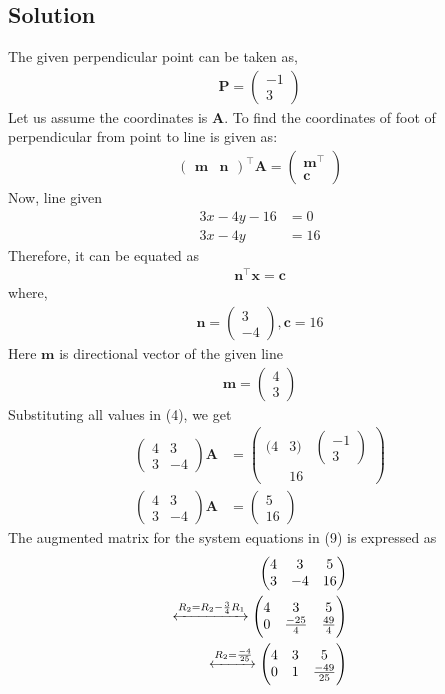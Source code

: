 \documentclass[12pt]{article}
\let\vec\mathbf
\newcommand{\myvec}[1]{\ensuremath{\begin{pmatrix}#1\end{pmatrix}}}
\let\vec\mathbf
\begin{document}
\begin{enumerate}
\section{Solution}
The given perpendicular point can be taken as,
\begin{align}
 \vec{P}=\myvec{
-1\\
3
}
\end{align}
Let us assume the coordinates is $\vec{A}$.
To find the coordinates of foot of perpendicular from point to line is given as:
\begin{align}
\myvec{
\vec{m}&\vec{n}
}^\top \vec{A} = \myvec{
\vec{m}^\top\\
\vec{c}
}
\end{align}
Now, line given 
\begin{align}
3x-4y-16 &=0\\
3x-4y&=16
\end{align}
Therefore, it can be equated as
\begin{align}
\vec{n}^\top \vec{x} = \vec{c}      \label{4}
\end{align}
where,
\begin{align}
\vec{n}=\myvec{
3\\
-4
}, \vec{c}=16
\end{align}
Here $\vec{m}$ is directional vector of the given line
\begin{align}
\vec{m}=\myvec{
4\\3}
\end{align}
Substituting all values in (4), we get
\begin{align}
\myvec
{4&3\\3&-4}\vec{A}&=\myvec{(4&3)&\myvec{-1\\3}\\&16}\\
\myvec
{4&3\\3&-4}\vec{A}&=\myvec{5\\16}  \label{9}
\end{align}
The augmented matrix for the system equations in (9) is expressed as
\begin{align}
  \myvec{
   4 &  3  & 5\\
   3 & -4  & 16} 
\\
  \xleftrightarrow[]{R_2=R_2-\frac{3}{4}R_1}
  \myvec{
  4 & 3 & 5\\
  0 & \frac{-25}{4} & \frac{49}{4}} 
\\
  \xleftrightarrow{R_2=\frac{-4}{25}}
  \myvec{
  4 & 3 & 5\\
  0 & 1 & \frac{-49}{25}}
\\

\end{align}
\end{enumerate}
\end{document}
